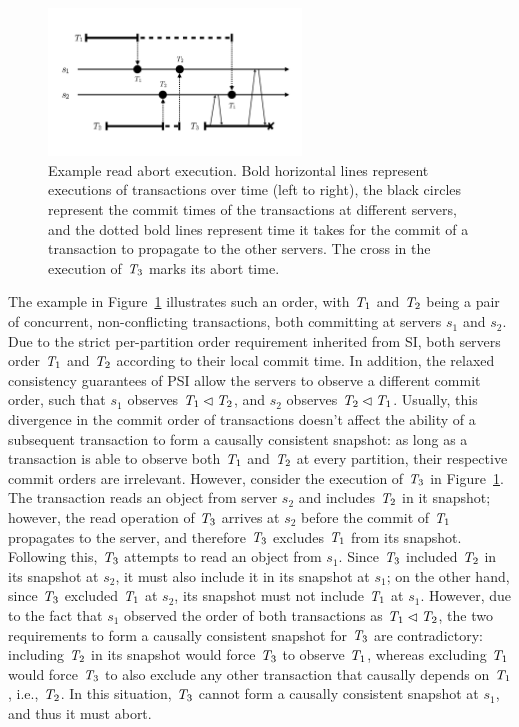 \begin{figure}[t]
\centering
\includegraphics[width=0.6\textwidth]{figures/ch4_abort_execution.pdf}
\vspace{-0.5cm}
\caption{Example read abort execution. Bold horizontal lines represent executions of transactions over time (left to right), the black circles represent the commit times of the transactions at different servers, and the dotted bold lines represent time it takes for the commit of a transaction to propagate to the other servers. The cross in the execution of $\mathit{T}_3$ marks its abort time. }
\label{fig:read_abort}
\end{figure}

The example in Figure~\ref{fig:read_abort} illustrates such an order, with $\mathit{T}_1$ and $\mathit{T}_2$ being a pair of concurrent, non-conflicting transactions, both committing at servers $s_1$ and $s_2$. Due to the strict per-partition order requirement inherited from SI, both servers order $\mathit{T}_1$ and $\mathit{T}_2$ according to their local commit time. In addition, the relaxed consistency guarantees of PSI allow the servers to observe a different commit order, such that $s_1$ observes $\mathit{T}_1 \lhd \mathit{T}_2$, and $s_2$ observes $\mathit{T}_2 \lhd \mathit{T}_1$. Usually, this divergence in the commit order of transactions doesn't affect the ability of a subsequent transaction to form a causally consistent snapshot: as long as a transaction is able to observe both $\mathit{T}_1$ and $\mathit{T}_2$ at every partition, their respective commit orders are irrelevant. However, consider the execution of $\mathit{T}_3$ in Figure~\ref{fig:read_abort}. The transaction reads an object from server $s_2$ and includes $\mathit{T}_2$ in it snapshot; however, the read operation of $\mathit{T}_3$ arrives at $s_2$ before the commit of $\mathit{T}_1$ propagates to the server, and therefore $\mathit{T}_3$ excludes $\mathit{T}_1$ from its snapshot. Following this, $\mathit{T}_3$ attempts to read an object from $s_1$. Since $\mathit{T}_3$ included $\mathit{T}_2$ in its snapshot at $s_2$, it must also include it in its snapshot at $s_1$; on the other hand, since $\mathit{T}_3$ excluded $\mathit{T}_1$ at $s_2$, its snapshot must not include $\mathit{T}_1$ at $s_1$. However, due to the fact that $s_1$ observed the order of both transactions as $\mathit{T}_1 \lhd \mathit{T}_2$, the two requirements to form a causally consistent snapshot for $\mathit{T}_3$ are contradictory: including $\mathit{T}_2$ in its snapshot would force $\mathit{T}_3$ to observe $\mathit{T}_1$, whereas excluding $\mathit{T}_1$ would force $\mathit{T}_3$ to also exclude any other transaction that causally depends on $\mathit{T}_1$, i.e., $\mathit{T}_2$. In this situation, $\mathit{T}_3$ cannot form a causally consistent snapshot at $s_1$, and thus it must abort.
